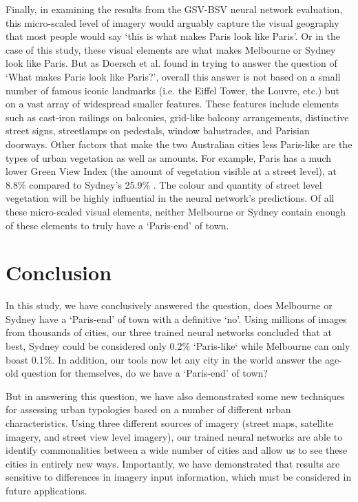 \documentclass[10pt,letterpaper,hidelinks]{article}
\begin{document}
Finally, in examining the results from the GSV-BSV neural network evaluation, this micro-scaled level of imagery would arguably capture the visual geography that most people would say `this is what makes Paris look like Paris'. Or in the case of this study, these visual elements are what makes Melbourne or Sydney look like Paris. But as Doersch et al. \cite{Doersch2012} found in trying to answer the question of `What makes Paris look like Paris?', overall this answer is not based on a small number of famous iconic landmarks (i.e. the Eiffel Tower, the Louvre, etc.) but on a vast array of widespread smaller features. These features include elements such as cast-iron railings on balconies, grid-like balcony arrangements, distinctive street signs, streetlamps on pedestals, window balustrades, and Parisian doorways. Other factors that make the two Australian cities less Paris-like are the types of urban vegetation as well as amounts. For example, Paris has a much lower Green View Index (the amount of vegetation visible at a street level), at 8.8\% compared to Sydney's 25.9\% \cite{Li2015}. The colour and quantity of street level vegetation will be highly influential in the neural network's predictions. Of all these micro-scaled visual elements, neither Melbourne or Sydney contain enough of these elements to truly have a `Paris-end' of town.



\section*{Conclusion}\label{sec:conclusion}

In this study, we have conclusively answered the question, does Melbourne or Sydney have a `Paris-end' of town with a definitive `no'. Using millions of images from thousands of cities, our three trained neural networks concluded that at best, Sydney could be considered only 0.2\% `Paris-like` while Melbourne can only boast 0.1\%. In addition, our tools now let any city in the world answer the age-old question for themselves, do we have a `Paris-end' of town?

But in answering this question, we have also demonstrated some new techniques for assessing urban typologies based on a number of different urban characteristics. Using three different sources of imagery (street maps, satellite imagery, and street view level imagery), our trained neural networks are able to identify commonalities between a wide number of cities and allow us to see these cities in entirely new ways. Importantly, we have demonstrated that results are sensitive to differences in imagery input information, which must be considered in future applications. 
\end{document}
